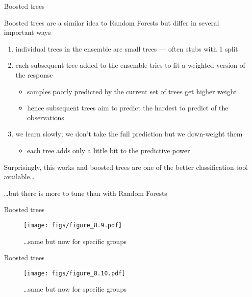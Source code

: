 \documentclass[11pt,ignorenonframetext,compress, aspectratio=169]{beamer}
\providecommand{\tightlist}{%
  \setlength{\itemsep}{0pt}\setlength{\parskip}{0pt}}
\begin{document}
\begin{frame}{Boosted trees}

Boosted trees are a similar idea to Random Forests but differ in several
important ways

\begin{enumerate}
\def\labelenumi{\arabic{enumi}.}
\tightlist
\item
  individual trees in the ensemble are small trees --- often stubs with
  1 split
\item
  each subsequent tree added to the ensemble tries to fit a weighted
  version of the response

  \begin{itemize}
  \tightlist
  \item
    samples poorly predicted by the current set of trees get higher
    weight
  \item
    hence subsequent trees aim to predict the hardest to predict of the
    observations
  \end{itemize}
\item
  we learn slowly; we don't take the full prediction but we down-weight
  them

  \begin{itemize}
  \tightlist
  \item
    each tree adds only a little bit to the predictive power
  \end{itemize}
\end{enumerate}

Surprisingly, this works and boosted trees are one of the better
classification tool available\ldots{}

\ldots{}but there is more to tune than with Random Forests

\end{frame}

\begin{frame}{Boosted trees}

\begin{figure}[htbp]
\centering
\texttt{[image: figs/figure\_8.9.pdf]}
\caption{\ldots{}same but now for specific groups}
\end{figure}

\end{frame}

\begin{frame}{Boosted trees}

\begin{figure}[htbp]
\centering
\texttt{[image: figs/figure\_8.10.pdf]}
\caption{\ldots{}same but now for specific groups}
\end{figure}

\end{frame}
\end{document}
